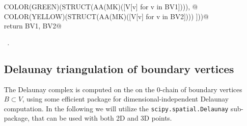 \documentclass[11pt,oneside]{article}	%
\begin{document}
\begin{flushleft}
\begin{list}{}{}
\mbox{}\verb@      COLOR(GREEN)(STRUCT(AA(MK)([V[v] for v in BV1]))), @\\
\mbox{}\verb@      COLOR(YELLOW)(STRUCT(AA(MK)([V[v] for v in BV2]))) ]))@\\
\mbox{}\verb@   return BV1, BV2@\\
\mbox{}\verb@@{\NWsep}
\end{list}
\vspace{-1ex}
\footnotesize\addtolength{\baselineskip}{-1ex}
\begin{list}{}{\setlength{\itemsep}{-\parsep}\setlength{\itemindent}{-\leftmargin}}
\item \NWtxtMacroRefIn\ .
\end{list}
\end{flushleft}
\subsection{Delaunay triangulation of boundary vertices}

The Delaunay complex is computed on the on the 0-chain of boundary vertices $B\subset V$, using some efficient package for dimensional-independent Delaunay computation. In the following  we will utilize the \texttt{scipy.spatial.Delaunay} sub-package, that can be used with both 2D and 3D points. 
\end{document}

